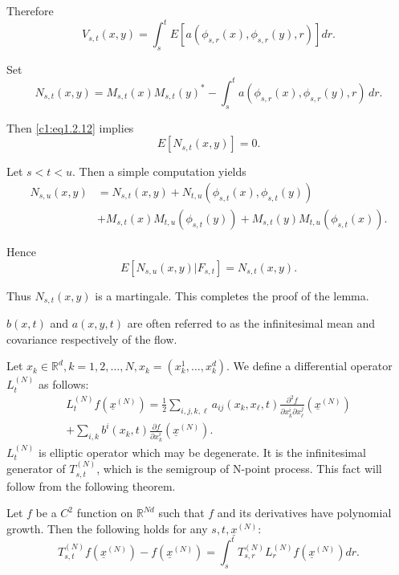 Therefore
\begin{equation*}
  V_{s,t}(x,y) = \int^t_s E[a(\phi_{s,r}(x),\phi_{s,r}(y),r)]
  dr. \tag{1.2.12}\label{c1:eq1.2.12} 
\end{equation*}

Set
\begin{equation*}
  N_{s,t}(x,y) = M_{s,t}(x) M_{s,t}(y)^* - \int^t_s
  a(\phi_{s,r}(x),\phi_{s,r}(y),r) \, 
dr. \tag{1.2.13}\label{c1:eq1.2.13} 
\end{equation*}	

Then \eqref{c1:eq1.2.12} implies
$$
E[N_{s,t}(x,y)] = 0.
$$

Let $s < t < u$. Then a simple computation yields
\begin{align*}
N_{s,u}(x,y) & = N_{s,t}(x,y) + N_{t,u}(\phi_{s,t}(x), \phi_{s,t}(y)) \\
& + M_{s,t}(x) M_{t,u} (\phi_{s,t}(y)) + M_{s,t}(y)M_{t,u}(\phi_{s,t}(x)).
\end{align*}

Hence
$$
E[N_{s,u}(x,y) |F_{s,t}] = N_{s,t}(x,y).
$$

Thus $N_{s,t}(x,y)$ is a martingale. This completes the proof of the
lemma.

\setcounter{remark}{3}
\begin{remark}\pageoriginale %
  $b(x,t)$ and $a(x,y,t)$ are often referred to as the infinitesimal
  mean and covariance respectively of the flow.
\end{remark}

Let $x_k \in \mathbb{R}^d, k = 1,2, \ldots,  N, x_k = (x^1_k,
\ldots,  x^d_k)$. We define a differential operator $L^{(N)}_t$ as
follows:  
\begin{multline*}
  L^{(N)}_t f(\underline{x}^{(N)}) = \frac{1}{2} \sum_{i,j,k,\ell}
  a_{ij}(x_k,  x_\ell, t) \frac{\partial^2 f}{\partial x^i_k \partial
    x^j_\ell} (\underline{x}^{(N)})\\ 
  + \sum_{i,k} b^i(x_k, t) \frac{\partial f}{\partial x^i_k}
  (\underline{x}^{(N)}). \tag{1.2.14}\label{c1:eq1.2.14} 
\end{multline*}
$L^{(N)}_t$ is elliptic operator which may be degenerate. It is the
infinitesimal generator of $T^{(N)}_{s,t}$, which is the semigroup of
N-point process. This fact will follow from the following theorem. 
\setcounter{theorem}{4}
\begin{theorem}\label{c1:thm1.2.5} %
  Let $f$ be a $C^2$ function on $\mathbb{R}^{Nd}$ such that $f$ and its
  derivatives have polynomial growth. Then the following holds for any
  $s,t, \underline{x}^{(N)}$:   
  \begin{equation*}
    T^{(N)}_{s,t} f(\underline{x}^{(N)}) - f(\underline{x}^{(N)}) =
    \int^t_s T^{(N)}_{s,r} L^{(N)}_{r}
    f(\underline{x}^{(N)})dr. \tag{1.2.15}\label{c1:eq1.2.15} 
  \end{equation*}
\end{theorem}

